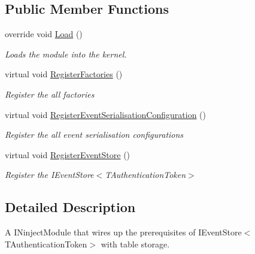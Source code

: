 \subsection*{Public Member Functions}
\begin{DoxyCompactItemize}
\item 
override void \hyperlink{classCqrs_1_1Ninject_1_1Azure_1_1BlobStorage_1_1Configuration_1_1TableStoragEventStoreModule_a00d516abc48623861401c6820091537a_a00d516abc48623861401c6820091537a}{Load} ()
\begin{DoxyCompactList}\small\item\em Loads the module into the kernel. \end{DoxyCompactList}\item 
virtual void \hyperlink{classCqrs_1_1Ninject_1_1Azure_1_1BlobStorage_1_1Configuration_1_1TableStoragEventStoreModule_a5e2b0f48414eb9863a8457766a2c585b_a5e2b0f48414eb9863a8457766a2c585b}{Register\+Factories} ()
\begin{DoxyCompactList}\small\item\em Register the all factories \end{DoxyCompactList}\item 
virtual void \hyperlink{classCqrs_1_1Ninject_1_1Azure_1_1BlobStorage_1_1Configuration_1_1TableStoragEventStoreModule_a01e4cd605fe9df419f99732e6fde48ac_a01e4cd605fe9df419f99732e6fde48ac}{Register\+Event\+Serialisation\+Configuration} ()
\begin{DoxyCompactList}\small\item\em Register the all event serialisation configurations \end{DoxyCompactList}\item 
virtual void \hyperlink{classCqrs_1_1Ninject_1_1Azure_1_1BlobStorage_1_1Configuration_1_1TableStoragEventStoreModule_adc8463786567202b9af8af7cf8f40f07_adc8463786567202b9af8af7cf8f40f07}{Register\+Event\+Store} ()
\begin{DoxyCompactList}\small\item\em Register the I\+Event\+Store$<$\+T\+Authentication\+Token$>$ \end{DoxyCompactList}\end{DoxyCompactItemize}


\subsection{Detailed Description}
A I\+Ninject\+Module that wires up the prerequisites of I\+Event\+Store$<$\+T\+Authentication\+Token$>$ with table storage. 


